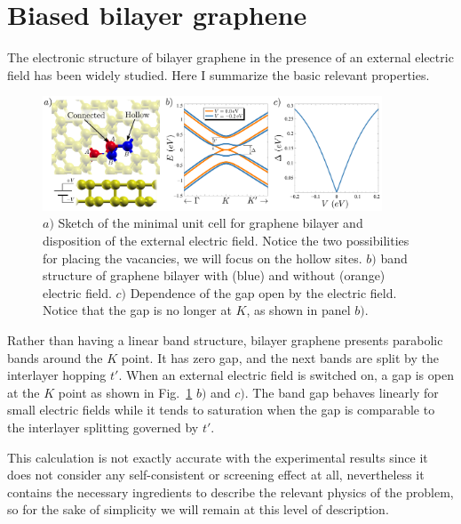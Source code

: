 \section{Biased bilayer graphene}
The electronic structure of bilayer graphene in the presence of an external electric field has been widely studied. Here I summarize the basic relevant properties.\\
\begin{figure}[!ht!]
\centering
\includegraphics[width=0.9\textwidth]{artlat/fig/bands_bilayer.pdf}
\vspace{-5pt}
\caption{$a)$ Sketch of the minimal unit cell for graphene bilayer and disposition of the external electric field. Notice the two possibilities for placing the vacancies, we will focus on the hollow sites. $b)$ band structure of graphene bilayer with (blue) and without (orange) electric field. $c)$ Dependence of the gap open by the electric field. Notice that the gap is no longer at $K$, as shown in panel $b)$.}
\label{bilayer2d}
\end{figure}
Rather than having a linear band structure, bilayer graphene presents parabolic bands around the $K$ point. It has zero gap, and the next bands are split by the interlayer hopping $t'$. When an external electric field is switched on, a gap is open at the $K$ point as shown in Fig.~\ref{bilayer2d} $b)$ and $c)$. The band gap behaves linearly for small electric fields while it tends to saturation when the gap is comparable to the interlayer splitting governed by $t'$.

This calculation is not exactly accurate with the experimental results\cite{Zhang2009} since it does not consider any self-consistent or screening effect at all, nevertheless it contains the necessary ingredients to describe the relevant physics of the problem, so for the sake of simplicity we will remain at this level of description.



